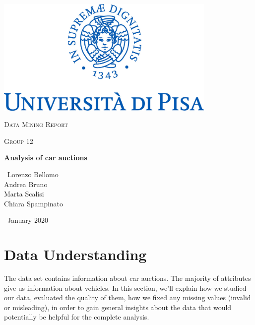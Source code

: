 \documentclass{article}
\begin{document}
	
	\begin{titlepage}
		\centering
		\includegraphics[width=0.80\textwidth]{marchio.jpg}\par\vspace{2cm}
		{\scshape\LARGE Data Mining Report \par}
		\vspace{1cm}
		{\scshape\Large Group 12 \\ \par}
		\vspace{1cm}
		{\huge\bfseries Analysis of car auctions\par}
		\vspace{2cm}
		{\Large\ Lorenzo Bellomo \\ Andrea Bruno \\ Marta Scalisi \\ Chiara Spampinato\par}
		\vspace{4cm}
		{\Large\ January 2020\par}
	\end{titlepage}
	
	
	
	
	\section{Data Understanding}
	The data set contains information about car auctions. The majority of attributes give us information about vehicles. 
	In this section, we'll explain how we studied our data, evaluated the quality of them, how we fixed any missing values (invalid or misleading), in order to gain general insights about the data that would potentially be helpful for the complete analysis.
	
\end{document}
